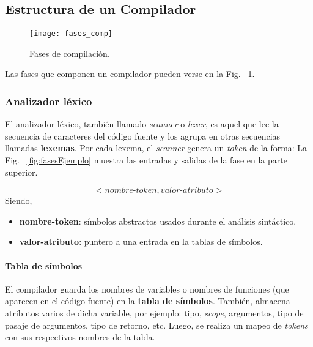 
\subsection{Estructura de un Compilador}

    \label{estructuraCompiladores}

    \begin{figure}[t]
        \begingroup
            \centering
                \texttt{[image: fases\_comp]}
                \caption{Fases de compilación.}
                \label{fig:fasesComp}
            \par
        \endgroup

    \end{figure}

    Las fases que componen un compilador \cite{aho_compilers:_2007} pueden verse en la Fig. ~\ref{fig:fasesComp}.

\subsubsection{Analizador léxico}

    El analizador léxico, también llamado \emph{scanner} o \emph{lexer}, es aquel que lee la secuencia de caracteres del código fuente y los agrupa en
    otras secuencias llamadas \textbf{lexemas}. Por cada lexema, el \emph{scanner} genera un \emph{token} de la forma:
    La Fig. ~\ref{fig:fasesEjemplo} muestra las entradas y salidas de la fase en la parte superior.

    \begin{equation}
    \label{eq:1}
    <nombre\text{-}token, valor\text{-}atributo>
    \end{equation}
    Siendo, 
    \begin{itemize}
        \item \textbf{nombre-token}: símbolos abstractos usados durante el análisis sintáctico.
        \item \textbf{valor-atributo}: puntero a una entrada en la tablas de símbolos.
    \end{itemize}

    \paragraph*{Tabla de símbolos}

    El compilador guarda los nombres de variables o nombres de funciones (que aparecen en el
    código fuente) en la \textbf{tabla de símbolos}. También, almacena atributos 
    varios de dicha variable,
    por ejemplo: tipo, \emph{scope}, argumentos, tipo de pasaje de argumentos, 
    tipo de retorno, etc.
    Luego, se realiza un mapeo de \emph{tokens} con sus respectivos nombres de la tabla.


